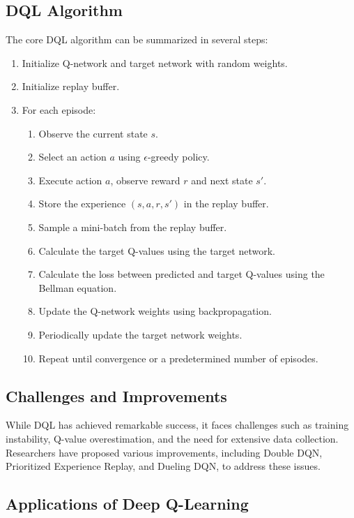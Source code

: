 \documentclass{scrartcl}
\begin{document}
\subsection{DQL Algorithm}

The core DQL algorithm can be summarized in several steps:

\begin{enumerate}
\item Initialize Q-network and target network with random weights.
\item Initialize replay buffer.
\item For each episode:
   \begin{enumerate}
   \item Observe the current state $s$.
   \item Select an action $a$ using $\epsilon$-greedy policy.
   \item Execute action $a$, observe reward $r$ and next state $s'$.
   \item Store the experience $(s, a, r, s')$ in the replay buffer.
   \item Sample a mini-batch from the replay buffer.
   \item Calculate the target Q-values using the target network.
   \item Calculate the loss between predicted and target Q-values using the Bellman equation.
   \item Update the Q-network weights using backpropagation.
   \item Periodically update the target network weights.
   \item Repeat until convergence or a predetermined number of episodes.
   \end{enumerate}
\end{enumerate}

\subsection{Challenges and Improvements}

While DQL has achieved remarkable success, it faces challenges such as training instability, Q-value overestimation, and the need for extensive data collection. Researchers have proposed various improvements, including Double DQN, Prioritized Experience Replay, and Dueling DQN, to address these issues.

\subsection{Applications of Deep Q-Learning}
\end{document}
